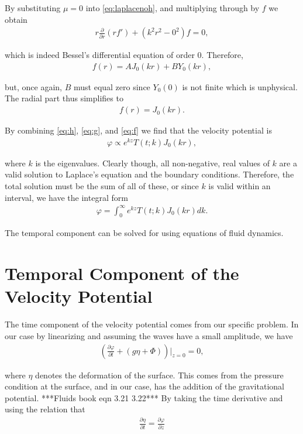 By substituting $\mu = 0$ into \eqref{eq:laplacenoh}, and multiplying through by $f$ we obtain
\begin{align*}
r \frac{\partial}{\partial r}(rf') + (k^2r^2 - 0^2)f = 0,
\end{align*}

which is indeed Bessel's differential equation of order $0$. Therefore,
\begin{align*}
f(r) = A J_0(kr) + B Y_0(kr),
\end{align*}

but, once again, $B$ must equal zero since $Y_0(0)$ is not finite which is unphysical. The radial part thus simplifies to
\begin{align}
\label{eq:f}
f(r) = J_0(kr).
\end{align}

By combining \eqref{eq:h}, \eqref{eq:g}, and \eqref{eq:f} we find that the velocity potential is 
\begin{align*}
\varphi \propto e^{kz}T(t;k)J_0(kr),
\end{align*}

where $k$ is the eigenvalues. Clearly though, all non-negative, real values of $k$ are a valid solution to Laplace's equation and the boundary conditions. Therefore, the total solution must be the sum of all of these, or since $k$ is valid within an interval, we have the integral form 
\begin{align}
\label{eq:phieigen}
\varphi = \int_0^\infty e^{kz}T(t;k)J_0(kr)dk.
\end{align}

The temporal component can be solved for using equations of fluid dynamics.

\section{Temporal Component of the Velocity Potential}

The time component of the velocity potential comes from our specific problem. In our case by linearizing and assuming the waves have a small amplitude, we have
\begin{align*}
\left( \frac{\partial \varphi}{\partial t} + (g \eta + \Phi) \right) \bigg|_{z=0} = 0,
\end{align*}

where $\eta$ denotes the deformation of the surface. This comes from the pressure condition at the surface, and in our case, has the addition of the gravitational potential. ***Fluids book eqn 3.21 3.22*** By taking the time derivative and using the relation that
\begin{align}
\label{eq:smallamp}
\frac{\partial \eta}{\partial t} = \frac{\partial \varphi}{\partial z}
\end{align}

